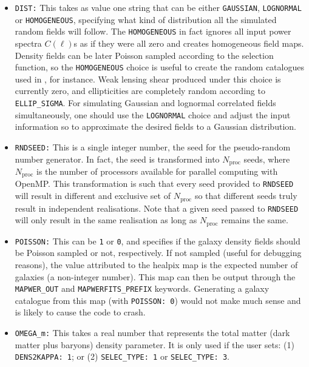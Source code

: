 \documentclass[12pt]{book} %
\newcommand{\nv}[1]{\mathrm{#1}}                 %
\begin{document}
\begin{itemize}

\item {\tt DIST:} This takes as value one string that can be either {\tt GAUSSIAN}, 
  {\tt LOGNORMAL} or {\tt HOMOGENEOUS}, specifying what kind of distribution all 
  the simulated random fields will follow. The {\tt HOMOGENEOUS} in fact ignores 
  all input power spectra $C(\ell)$s as if they were all zero and creates homogeneous 
  field maps. Density fields can be later Poisson sampled according to the selection 
  function, so the {\tt HOMOGENEOUS} choice is useful to create the random catalogues 
  used in \citet{LandySzalay93x}, for instance. Weak lensing shear produced under this 
  choice is currently zero, and ellipticities are completely random according to 
  {\tt ELLIP\_SIGMA}. For simulating Gaussian and lognormal correlated fields 
  simultaneously, one should use the {\tt LOGNORMAL} choice and adjust the input 
  information so to approximate the desired fields to a Gaussian distribution.

\item {\tt RNDSEED:} This is a single integer number, the seed for the pseudo-random 
  number generator. In fact, the seed is transformed into $N_{\nv{proc}}$ seeds, where 
  $N_{\nv{proc}}$ is the number of processors available for parallel computing with 
  {\sc OpenMP}. This transformation is such that every seed provided to {\tt RNDSEED} 
  will result in different and exclusive set of $N_{\nv{proc}}$ so that different seeds truly 
  result in independent realisations. Note that a given seed passed to {\tt RNDSEED} will 
  only result in the same realisation as long as $N_{\nv{proc}}$ remains the same.

\item {\tt POISSON:} This can be {\tt 1} or {\tt 0}, and specifies if the galaxy density 
  fields should be Poisson sampled or not, respectively. If not sampled (useful for debugging 
  reasons), the value attributed to the {\sc healpix} map is the expected number of galaxies 
  (a non-integer number). This map can then be output through the {\tt MAPWER\_OUT} and 
  {\tt MAPWERFITS\_PREFIX} keywords. Generating a galaxy catalogue from this map (with 
  {\tt POISSON: 0}) would not make much sense and is likely to cause the code to crash.

\item {\tt OMEGA\_m:} This takes a real number that represents the total matter (dark matter 
  plus baryons) density parameter. It is only used if the user sets: (1) {\tt DENS2KAPPA: 1}; or 
  (2) {\tt SELEC\_TYPE: 1} or {\tt SELEC\_TYPE: 3}.


\end{itemize}
\end{document}
